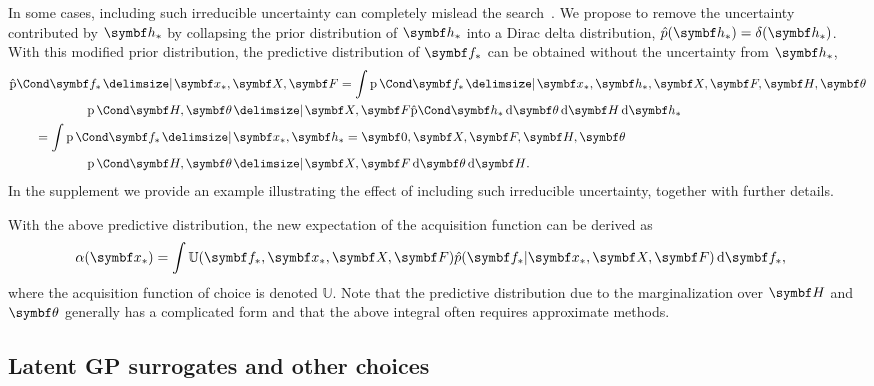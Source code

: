 In some cases, including such irreducible uncertainty can completely mislead the search~\parencite{gonzalez_preferential_2017}.
We propose to remove the uncertainty contributed by $\mat{h}_*$ by collapsing the prior distribution of $\mat{h}_*$ into a Dirac delta distribution, $\hat{p}(\mat{h}_*) = \delta(\mat{h}_*)$.
With this modified prior distribution, the predictive distribution of $\mat{f}_*$ can be obtained without the uncertainty from $\mat{h}_*$,
\begin{align}
    \begin{split}
        \MoveEqLeft\hProb{\mat{f}_* \given \mat{x}_*,  \mat{X}, \mat{F}} =
        \int \Prob{\mat{f}_* \given \mat{x}_*,\mat{h}_*,  \mat{X}, \mat{F},\mat{H}, \mat{\theta}} \\
        &\qquad\qquad\Prob{\mat{H}, \mat{\theta} \given \mat{X}, \mat{F}} \hProb{\mat{h}_*} \diff{\mat{\theta}}\diff{\mat{H}}\diff{\mat{h}_*} \\
        &= \int \Prob{\mat{f}_* \given \mat{x}_*,\mat{h}_*=\mat{0},  \mat{X}, \mat{F},\mat{H}, \mat{\theta}} \\
        &\qquad\qquad\Prob{\mat{H}, \mat{\theta} \given \mat{X}, \mat{F}} \diff{\mat{\theta}}\diff{\mat{H}}.
    \end{split}
\end{align}
In the supplement we provide an example illustrating the effect of including such irreducible uncertainty,
together with further details.

With the above predictive distribution, the new expectation of the acquisition function can be derived as
\begin{align}
    \begin{split}
        \label{eq:bayesian_optimization:utility}
        \MoveEqLeft[1]\alpha(\mat{x}_\ast) =
        \int
        \mathbb{U}(\mat{f}_\ast, \mat{x}_\ast, \mat{X}, \mat{F}) \hat{p}(\mat{f}_\ast | \mat{x}_\ast, \mat{X}, \mat{F}) \diff{\mat{f}_\ast},
    \end{split}
\end{align}
where the acquisition function of choice is denoted $\mathbb{U}$.
Note that the predictive distribution due to the marginalization over $\mat{H}$ and $\mat{\theta}$ generally has a complicated form
and that the above integral often requires approximate methods.

\subsection{Latent GP surrogates and other choices}
\label{sub:bayesian_optimization:latent_gp_surrogate}

